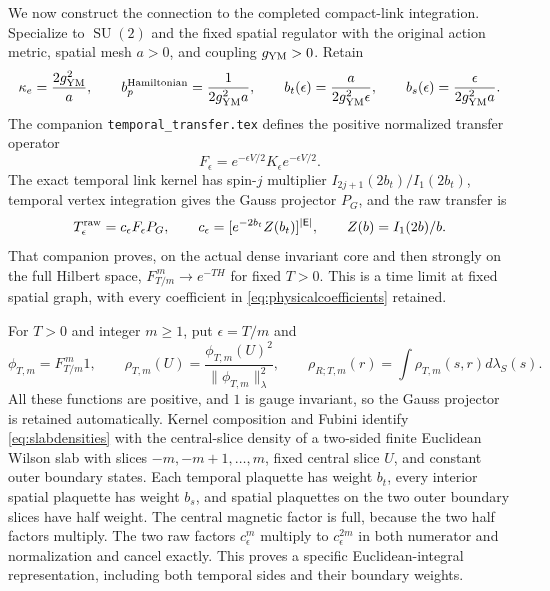 \documentclass[11pt]{article}
\newcommand{\SU}{\operatorname{SU}}
\begin{document}
We now construct the connection to the completed compact-link
integration. Specialize to $\SU(2)$ and the fixed spatial regulator
with the original action metric, spatial mesh $a>0$, and coupling
$g_{\rm YM}>0$. Retain
\begin{equation}\label{eq:physicalcoefficients}
 \kappa_e=\frac{2g_{\rm YM}^2}{a},\qquad
 b_p^{\rm Hamiltonian}=\frac1{2g_{\rm YM}^2a},\qquad
 b_t(\epsilon)=\frac{a}{2g_{\rm YM}^2\epsilon},\qquad
 b_s(\epsilon)=\frac{\epsilon}{2g_{\rm YM}^2a}.
\end{equation}
The companion \texttt{temporal\_transfer.tex} defines the positive
normalized transfer operator
\[
 F_\epsilon=e^{-\epsilon V/2}K_\epsilon e^{-\epsilon V/2}.
\]
The exact temporal link kernel has
spin-$j$ multiplier $I_{2j+1}(2b_t)/I_1(2b_t)$, temporal vertex
integration gives the Gauss projector $P_G$, and the raw transfer is
\begin{equation}\label{eq:rawrelation}
 T_\epsilon^{\rm raw}=c_\epsilon F_\epsilon P_G,
 \qquad c_\epsilon=[e^{-2b_t}Z(b_t)]^{|\mathsf E|},\qquad
 Z(b)=I_1(2b)/b.
\end{equation}
That companion proves, on the actual dense invariant core and then
strongly on the full Hilbert space,
$F_{T/m}^{\,m}\to e^{-TH}$ for fixed $T>0$. This is a time limit at
fixed spatial graph, with every coefficient in
\eqref{eq:physicalcoefficients} retained.

For $T>0$ and integer $m\geq1$, put $\epsilon=T/m$ and
\begin{equation}\label{eq:slabdensities}
 \phi_{T,m}=F_{T/m}^{\,m}1,\qquad
 \rho_{T,m}(U)=\frac{\phi_{T,m}(U)^2}{\|\phi_{T,m}\|_\lambda^2},\qquad
 \rho_{R;T,m}(r)=\int\rho_{T,m}(s,r)d\lambda_S(s).
\end{equation}
All these functions are positive, and $1$ is gauge invariant, so the
Gauss projector is retained automatically. Kernel composition and
Fubini identify \eqref{eq:slabdensities} with the central-slice density
of a two-sided finite Euclidean Wilson slab with slices
$-m,-m+1,\ldots,m$, fixed central slice $U$, and constant outer
boundary states. Each temporal plaquette has weight $b_t$, every
interior spatial plaquette has weight $b_s$, and spatial plaquettes
on the two outer boundary slices have half weight. The central
magnetic factor is full, because the two half factors multiply.
The two raw factors $c_\epsilon^m$ multiply to $c_\epsilon^{2m}$ in
both numerator and normalization and cancel exactly. This proves a
specific Euclidean-integral representation, including both temporal
sides and their boundary weights.
\end{document}
